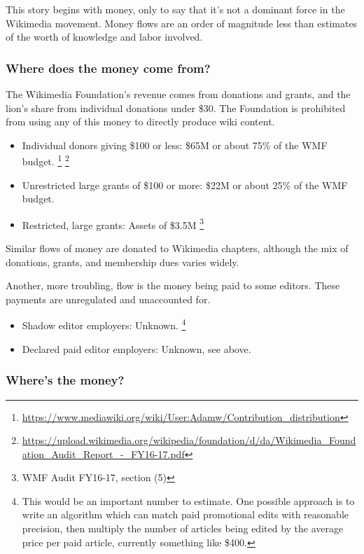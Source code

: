 \documentclass[format=sigconf, authorversion]{acmart}
\begin{document}
This story begins with money, only to say that it's not a dominant force in the Wikimedia movement.  Money flows are an order of magnitude less than estimates of the worth of knowledge and labor involved.

\subsubsection{Where does the money come from?}

The Wikimedia Foundation's revenue comes from donations and grants, and the lion's share from individual donations under \$30.  The Foundation is prohibited from using any of this money to directly produce wiki content.

\begin{itemize}
\item Individual donors giving \$100 or less: \$65M or about 75\% of the WMF budget.
\footnote{\url{https://www.mediawiki.org/wiki/User:Adamw/Contribution_distribution}}
\footnote{\label{wmfaudit}\url{https://upload.wikimedia.org/wikipedia/foundation/d/da/Wikimedia_Foundation_Audit_Report_-_FY16-17.pdf}}
\item Unrestricted large grants of \$100 or more: \$22M or about 25\% of the WMF budget.
\item Restricted, large grants: Assets of \$3.5M
\footnote{WMF Audit FY16-17, section (5)}
\end{itemize}

Similar flows of money are donated to Wikimedia chapters, although the mix of donations, grants, and membership dues varies widely.

Another, more troubling, flow is the money being paid to some editors.  These payments are unregulated and unaccounted for.
\begin{itemize}
\item Shadow editor employers: Unknown.
\footnote{This would be an important number to estimate.  One possible approach is to write an algorithm which can match paid promotional edits with reasonable precision, then multiply the number of articles being edited by the average price per paid article, currently something like \$400.}
\item Declared paid editor employers: Unknown, see above.
\end{itemize}

\subsubsection{Where's the money?}
\end{document}
